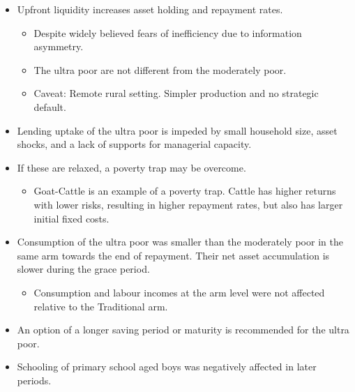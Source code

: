 \begin{mdframed}[style={SecItemize}, frametitle={Conclusion}]
\begin{itemize}
\vspace{1.0ex}\setlength{\itemsep}{1.0ex}\setlength{\baselineskip}{12pt}
\item	Upfront liquidity increases asset holding and repayment rates.
	\begin{itemize}
	\vspace{1.0ex}\setlength{\itemsep}{1.0ex}\setlength{\baselineskip}{12pt}
	\item	Despite widely believed fears of inefficiency due to information asymmetry.
	\item	The ultra poor are not different from the moderately poor.
	\item	Caveat: Remote rural setting. Simpler production and no strategic default.
	\end{itemize}
\item	Lending uptake of the ultra poor is impeded by small household size, asset shocks, and a lack of supports for managerial capacity.
\item	If these are relaxed, a poverty trap may be overcome.
	\begin{itemize}
	\vspace{1.0ex}\setlength{\itemsep}{1.0ex}\setlength{\baselineskip}{12pt}
	\item	Goat-Cattle is an example of  a poverty trap. Cattle has higher returns with lower risks, resulting in higher repayment rates, but also has larger initial fixed costs.
	\end{itemize}
\item	Consumption of the ultra poor was smaller than the moderately poor in the same arm towards the end of repayment. Their net asset accumulation is slower during the grace period.
	\begin{itemize}
	\vspace{1.0ex}\setlength{\itemsep}{1.0ex}\setlength{\baselineskip}{12pt}
	\item	Consumption and labour incomes at the arm level were not affected relative to the \textsf{Traditional} arm. 
	\end{itemize}
\item	An option of a longer saving period or maturity is recommended for the ultra poor.
\item	Schooling of primary school aged boys was negatively affected in later periods. 
\end{itemize}
\end{mdframed}

